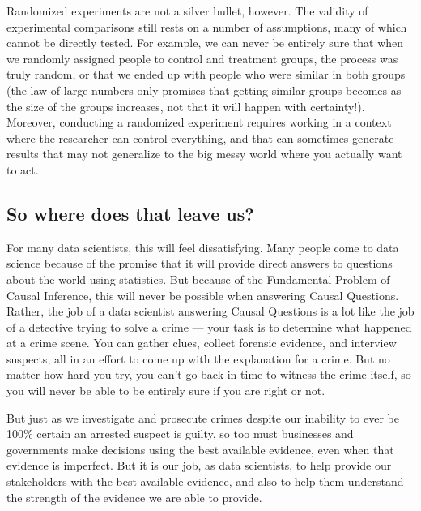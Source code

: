 \documentclass[letterpaper,10pt,english]{jupyterBook}
\begin{document}
\sphinxAtStartPar
Randomized experiments are not a silver bullet, however. The validity of experimental comparisons still rests on a number of assumptions, many of which cannot be directly tested. For example, we can never be entirely sure that when we randomly assigned people to control and treatment groups, the process was truly random, or that we ended up with people who were similar in both groups (the law of large numbers only promises that getting similar groups becomes  as the size of the groups increases, not that it will happen with certainty!). Moreover, conducting a randomized experiment requires working in a context where the researcher can control everything, and that can sometimes generate results that may not generalize to the big messy world where you actually want to act.


\subsection{So where does that leave us?}
\label{\detokenize{30_questions/40_answering_causal_questions:so-where-does-that-leave-us}}
\sphinxAtStartPar
For many data scientists, this will feel  dissatisfying. Many people come to data science because of the promise that it will provide direct answers to questions about the world using statistics. But because of the Fundamental Problem of Causal Inference, this will never be possible when answering Causal Questions. Rather, the job of a data scientist answering Causal Questions is a lot like the job of a detective trying to solve a crime — your task is to determine what  happened at a crime scene. You can gather clues, collect forensic evidence, and interview suspects, all in an effort to come up with the  explanation for a crime. But no matter how hard you try, you can’t go back in time to witness the crime itself, so you will never be able to be entirely sure if you are right or not.

\sphinxAtStartPar
But just as we investigate and prosecute crimes despite our inability to ever be 100\% certain an arrested suspect is guilty, so too must businesses and governments make decisions using the best available evidence, even when that evidence is imperfect. But it is our job, as data scientists, to help provide our stakeholders with the best available evidence, and also to help them understand the strength of the evidence we are able to provide.
\end{document}
